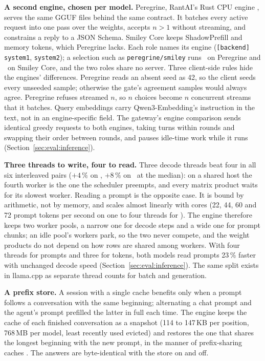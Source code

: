 \textbf{A second engine, chosen per model.} Peregrine, RantAI's Rust CPU
engine \cite{peregrine2026}, serves the same GGUF files behind the same
contract. It batches every active request into one pass over the weights,
accepts $n>1$ without streaming, and constrains a reply to a JSON Schema.
Smiley Core keeps ShadowPrefill and memory tokens, which Peregrine lacks. Each
role names its engine (\texttt{[backend] system1}, \texttt{system2}); a
selection such as \texttt{peregrine/smiley} runs \Sone\ on Peregrine and
\Stwo\ on Smiley Core, and the two roles share no server. Three client-side
rules hide the engines' differences. Peregrine reads an absent seed as 42, so
the client seeds every unseeded sample; otherwise the gate's agreement samples
would always agree. Peregrine refuses streamed $n$, so $n$ choices become $n$
concurrent streams that it batches. Query embeddings carry Qwen3-Embedding's
instruction in the text, not in an engine-specific field. The gateway's
engine comparison sends identical greedy requests to both engines, taking
turns within rounds and swapping their order between rounds, and pauses
idle-time work while it runs (Section~\ref{sec:eval:inference}).

\textbf{Three threads to write, four to read.} Three decode threads beat four
in all six interleaved pairs ($+4\,\%$ on \Sone, $+8\,\%$ on \Stwo\ at the
median): on a shared host the fourth worker is the one the scheduler preempts,
and every matrix product waits for its slowest worker. Reading a prompt is
the opposite case. It is bound by arithmetic, not by memory, and scales
almost linearly with cores (22, 44, 60 and 72 prompt tokens per second on one
to four threads for \Sone). The engine therefore keeps two worker pools, a
narrow one for decode steps and a wide one for prompt chunks; an idle pool's
workers park, so the two never compete, and the weight products do not depend
on how rows are shared among workers. With four threads for prompts and three
for tokens, both models read prompts 23\,\% faster with unchanged decode
speed (Section~\ref{sec:eval:inference}). The same split exists in llama.cpp
as separate thread counts for batch and generation.

\textbf{A prefix store.} A session with a single cache benefits only when a
prompt follows a conversation with the same beginning; alternating a chat
prompt and the agent's prompt prefilled the latter in full each time. The
engine keeps the cache of each finished conversation as a snapshot (114 to
147\,KB per position, 768\,MB per model, least recently used evicted) and
restores the one that shares the longest beginning with the new prompt, in
the manner of prefix-sharing caches \cite{zheng2024sglang}. The answers are
byte-identical with the store on and off.

